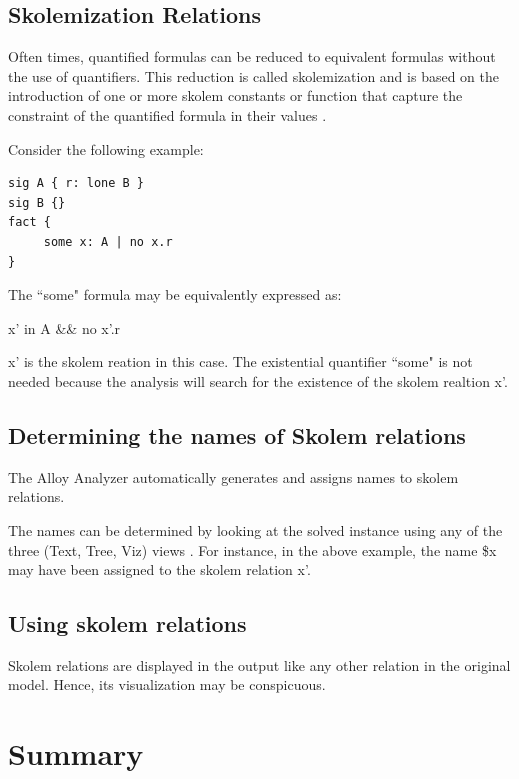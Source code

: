 \documentclass[a4paper,10pt]{report}
\begin{document}
\subsection{Skolemization Relations }
\label{Skolemization relations}

Often times, quantified formulas can be reduced to equivalent formulas without the use of quantifiers.
This reduction is called skolemization and is based on the introduction of one or more skolem constants or function that capture the constraint of the quantified formula in their values \cite{DanielJackson}.

Consider the following example: 

\begin{verbatim}
sig A { r: lone B } 
sig B {}
fact {
	 some x: A | no x.r
}
\end{verbatim}

 The ``some" formula may be equivalently expressed as: 

    x' in A \&\& no x'.r 
    
x' is the skolem reation in this case. The existential quantifier ``some" is not needed because the analysis will search for the existence of the skolem realtion x'\cite{D.Jackson}.
  
\subsection{Determining the names of Skolem relations }
\label{determine skolem relations}

 The Alloy Analyzer automatically generates and assigns names to skolem relations.
 
The names can be determined by looking at the solved instance using any of the three (Text, Tree, Viz) views \cite{DanielJackson}.
For instance, in the above example, the name \$x may have been assigned to the skolem relation x'. 

\subsection{Using skolem relations }
\label{Use of skolem relations}

Skolem relations are displayed in the output like any other relation in the original model. Hence, its visualization may be conspicuous.

\section{Summary}
\label{summary}
\end{document}
